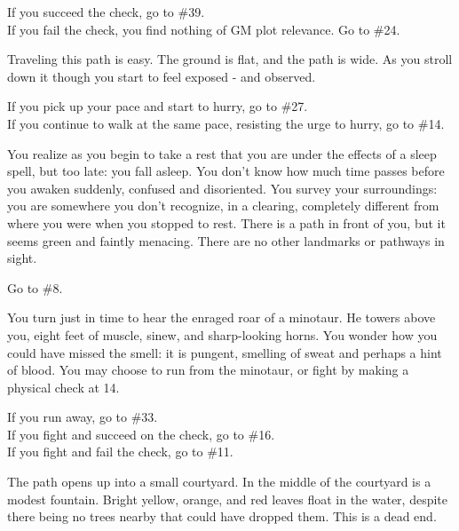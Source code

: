 \documentclass[green]{gl2018}
\begin{document}
\begin{large}
\begin{location}{34}
\begin{fromhere}
If you succeed the check, go to \#39.\\
 If you fail the check, you find nothing of GM plot relevance. Go to \#24.
\end{fromhere}
\end{location}
\begin{location}{35}
Traveling this path is easy. The ground is flat, and the path is wide. As you stroll down it though you start to feel exposed - and observed. 
\begin{fromhere}If you pick up your pace and start to hurry, go to \#27.\\
 If you continue to walk at the same pace, resisting the urge to hurry, go to \#14.
\end{fromhere}
\end{location}
\begin{location}{36}
You realize as you begin to take a rest that you are under the effects of a sleep spell, but too late: you fall asleep.  You don't know how much time passes before you awaken suddenly, confused and disoriented.  You survey your surroundings: you are somewhere you don't recognize, in a clearing, completely different from where you were when you stopped to rest.  There is a path in front of you, but it seems green and faintly menacing.  There are no other landmarks or pathways in sight.
\begin{fromhere}Go to \#8.\end{fromhere}
\end{location}
\begin{location}{37}
You turn just in time to hear the enraged roar of a minotaur.  He towers above you, eight feet of muscle, sinew, and sharp-looking horns.  You wonder how you could have missed the smell: it is pungent, smelling of sweat and perhaps a hint of blood.  You may choose to run from the minotaur, or fight by making a physical check at 14.
\begin{fromhere}
  If you run away, go to \#33.\\
If you fight and succeed on the check, go to \#16. \\
 If you fight and fail the check, go to \#11.
\end{fromhere}
\end{location}
\begin{location}{38}
The path opens up into a small courtyard. In the middle of the courtyard is a modest fountain.  Bright yellow, orange, and red leaves float in the water, despite there being no trees nearby that could have dropped them. This is a dead end.

\end{location}
\end{large}
\end{document}
